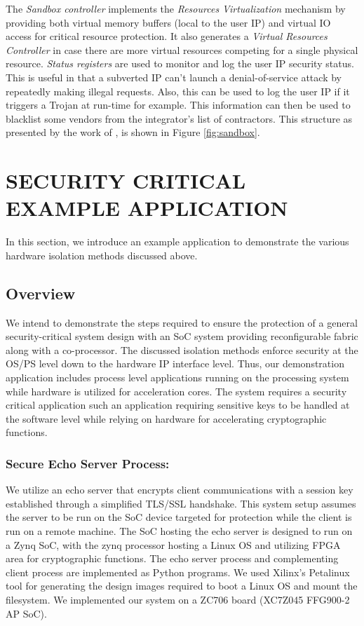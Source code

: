 \documentclass[sigconf]{acmart}
\theoremstyle{plain}
\theoremstyle{remark}
\begin{document}
The \textit{Sandbox controller} implements the \textit{Resources Virtualization} mechanism by providing both virtual memory buffers (local to the user IP) and virtual IO access for critical resource protection. It also generates a \textit{Virtual Resources Controller} in case there are more virtual resources competing for a single physical resource. \textit{Status registers} are used to monitor and log the user IP security status. This is useful in that a subverted IP can't launch a denial-of-service attack by repeatedly making illegal requests. Also, this can be used to log the user IP if it triggers a Trojan at run-time for example. This information can then be used to blacklist some vendors from the integrator's list of contractors. This structure as presented by the work of \cite{CAPSL}, is shown in Figure \ref{fig:sandbox}.


\section{SECURITY CRITICAL EXAMPLE APPLICATION} \label{sec:application}
In this section, we introduce an example application to demonstrate the various hardware isolation methods discussed above.

\subsection{Overview}
We intend to demonstrate the steps required to ensure the protection of a general security-critical system design with an SoC system providing reconfigurable fabric along with a co-processor. The discussed isolation methods enforce security at the OS/PS level down to the hardware IP interface level. Thus, our demonstration application includes process level applications running on the processing system while hardware is utilized for acceleration cores. The system requires a security critical application such an application requiring sensitive keys to be handled at the software level while relying on hardware for accelerating cryptographic functions.

\subsubsection{Secure Echo Server Process:}
We utilize an echo server that encrypts client communications with a session key established through a simplified TLS/SSL handshake. This system setup assumes the server to be run on the SoC device targeted for protection while the client is run on a remote machine. The SoC hosting the echo server is designed to run on a Zynq SoC, with the zynq processor hosting a Linux OS and utilizing FPGA area for cryptographic functions. The echo server process and complementing client process are implemented as Python programs. We used Xilinx's Petalinux tool for generating the design images required to boot a Linux OS and mount the filesystem. We implemented our system on a ZC706 board (XC7Z045 FFG900-2 AP SoC).
\end{document}
